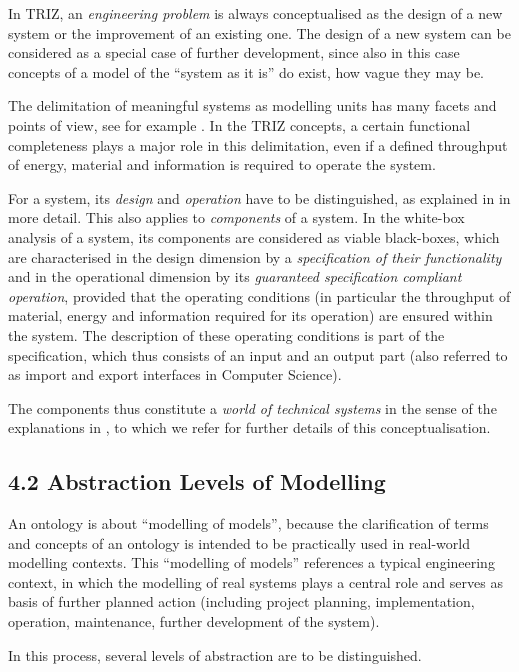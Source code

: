 \documentclass[12pt,a4paper]{article}
\begin{document}
In TRIZ, an \emph{engineering problem} is always conceptualised as the design
of a new system or the improvement of an existing one. The design of a new
system can be considered as a special case of further development, since also
in this case concepts of a model of the “system as it is” do exist, how vague
they may be.

The delimitation of meaningful systems as modelling units has many facets and
points of view, see for example \cite[section 8]{22}. In the TRIZ concepts, a
certain functional completeness plays a major role in this delimitation, even
if a defined throughput of energy, material and information is required to
operate the system.

For a system, its \emph{design} and \emph{operation} have to be distinguished,
as explained in \cite{8} in more detail. This also applies to
\emph{components} of a system. In the white-box analysis of a system, its
components are considered as viable black-boxes, which are characterised in
the design dimension by a \emph{specification of their functionality} and in
the operational dimension by its \emph{guaranteed specification compliant
  operation}, provided that the operating conditions (in particular the
throughput of material, energy and information required for its operation) are
ensured within the system. The description of these operating conditions is
part of the specification, which thus consists of an input and an output part
(also referred to as import and export interfaces in Computer Science).

The components thus constitute a \emph{world of technical systems} in the
sense of the explanations in \cite{8}, to which we refer for further details
of this conceptualisation.

\subsection*{4.2 Abstraction Levels of Modelling}

An ontology is about “modelling of models”, because the clarification of terms
and concepts of an ontology is intended to be practically used in real-world
modelling contexts. This “modelling of models” references a typical
engineering context, in which the modelling of real systems plays a central
role and serves as basis of further planned action (including project
planning, implementation, operation, maintenance, further development of the
system).

In this process, several levels of abstraction are to be distinguished.
\end{document}
